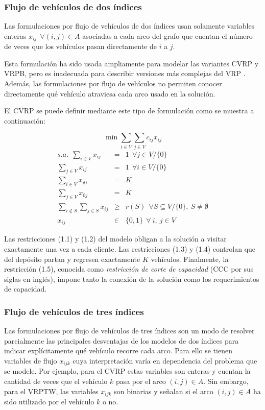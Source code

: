 \subsubsection{Flujo de vehículos de dos índices}
Las formulaciones por flujo de vehículos de dos índices usan solamente variables enteras $x_{ij} \ \ \forall (i, j) \in A$ asociadas a cada arco del grafo que cuentan el número de veces que los vehículos pasan directamente de $i$ a $j$.

Esta formulación ha sido usada ampliamente para modelar las variantes CVRP y VRPB, pero es inadecuada para describir versiones más complejas del VRP \cite{toth@vrp}. Además, las formulaciones por flujo de vehículos no permiten conocer directamente qué vehículo atraviesa cada arco usado en la solución.

El CVRP se puede definir mediante este tipo de formulación como se muestra a continuación:

$$
\min \displaystyle{\sum_{i \in V}\sum_{j \in V} c_{ij} x_{ij}}
$$
\begin{eqnarray}
s.a. \ \ \displaystyle{\sum_{i \in V} x_{ij}} & = & 1\ \ \forall j \in V / \{0\} \\
\displaystyle{\sum_{j \in V} x_{ij}} & = & 1\ \ \forall i \in V / \{0\} \\
\displaystyle{\sum_{i \in V} x_{i0}} & = & K\\
\displaystyle{\sum_{j \in V} x_{0j}} & = & K\\
\displaystyle{\sum_{i \not\in S}\sum_{j \in S} x_{ij}} & \geq & r(S) \ \ \forall S \subseteq V / \{0\},\ S \neq \emptyset\\
x_{ij} & \in & \{0, 1\} \ \ \forall\ i,\ j \in V
\end{eqnarray}

Las restricciones (1.1) y (1.2) del modelo obligan a la solución a visitar exactamente una vez a cada cliente. Las restricciones (1.3) y (1.4) controlan que del depósito partan y regresen exactamente $K$ vehículos. Finalmente, la restricción (1.5), conocida como {\it restricción de corte de capacidad} (CCC por sus siglas en inglés), impone tanto la conexión de la solución como los requerimientos de capacidad.

\subsubsection{Flujo de vehículos de tres índices}
Las formulaciones por flujo de vehículos de tres índices son un modo de resolver parcialmente las principales desventajas de los modelos de dos índices para indicar explícitamente qué vehículo recorre cada arco. Para ello se tienen variables de flujo $x_{ijk}$ cuya interpretación varía en dependencia del problema que se modele. Por ejemplo, para el CVRP estas variables son enteras y cuentan la cantidad de veces que el vehículo $k$ pasa por el arco $(i, j) \in A$. Sin embargo, para el VRPTW, las variables $x_{ijk}$ son binarias y señalan si el arco $(i, j) \in A$ ha sido utilizado por el vehículo $k$ o no.

